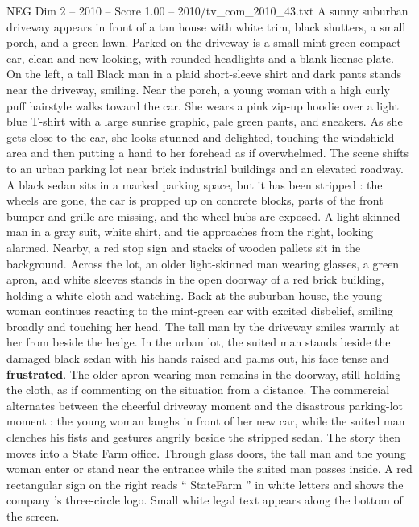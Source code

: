 \begin{textsample}{NEG Dim 2 – 2010 – Score 1.00 – 2010/tv\_com\_2010\_43.txt}  \label{ex:f2_neg_046}
A sunny suburban driveway appears in front of a tan house with white trim, black shutters, a small porch, and a green lawn.
Parked on the driveway is a small mint-green compact car, clean and new-looking, with rounded headlights and a blank license plate.
On the left, a tall Black man in a plaid short-sleeve shirt and dark pants stands near the driveway, smiling.
Near the porch, a young woman with a high curly puff hairstyle walks toward the car.
She wears a pink zip-up hoodie over a light blue T-shirt with a large sunrise graphic, pale green pants, and sneakers.
As she gets close to the car, she looks stunned and delighted, touching the windshield area and then putting a hand to her forehead as if overwhelmed.
The scene shifts to an urban parking lot near brick industrial buildings and an elevated roadway.
A black sedan sits in a marked parking space, but it has been stripped : the wheels are gone, the car is propped up on concrete blocks, parts of the front bumper and grille are missing, and the wheel hubs are exposed.
A light-skinned man in a gray suit, white shirt, and tie approaches from the right, looking alarmed.
Nearby, a red stop sign and stacks of wooden pallets sit in the background.
Across the lot, an older light-skinned man wearing glasses, a green apron, and white sleeves stands in the open doorway of a red brick building, holding a white cloth and watching.
Back at the suburban house, the young woman continues reacting to the mint-green car with excited disbelief, smiling broadly and touching her head.
The tall man by the driveway smiles warmly at her from beside the hedge.
In the urban lot, the suited man stands beside the damaged black sedan with his hands raised and palms out, his face tense and \textbf{frustrated}.
The older apron-wearing man remains in the doorway, still holding the cloth, as if commenting on the situation from a distance.
The commercial alternates between the cheerful driveway moment and the disastrous parking-lot moment : the young woman laughs in front of her new car, while the suited man clenches his fists and gestures angrily beside the stripped sedan.
The story then moves into a State Farm office.
Through glass doors, the tall man and the young woman enter or stand near the entrance while the suited man passes inside.
A red rectangular sign on the right reads “ StateFarm ” in white letters and shows the company ’s three-circle logo.
Small white legal text appears along the bottom of the screen.

\end{textsample}
